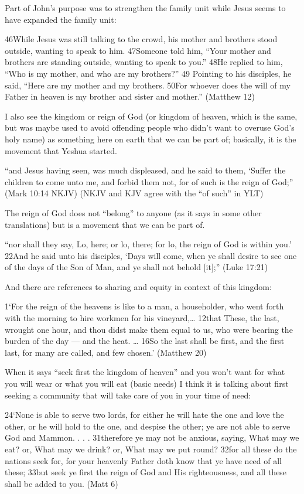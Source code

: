 \documentclass[11pt]{article}
\begin{document}
Part of John’s purpose was to strengthen the family unit while Jesus seems to have expanded the family unit:


46While Jesus was still talking to the crowd, his mother and brothers stood outside, wanting to speak to him. 47Someone told him, “Your mother and brothers are standing outside, wanting to speak to you.” 48He replied to him, “Who is my mother, and who are my brothers?” 49 Pointing to his disciples, he said, “Here are my mother and my brothers. 50For whoever does the will of my Father in heaven is my brother and sister and mother.” (Matthew 12)

I also see the kingdom or reign of God (or kingdom of heaven, which is the
same, but was maybe used to avoid offending people who didn’t want to overuse God’s holy name) as something here on earth that we can be part of; basically, it is the movement that Yeshua started.

“and Jesus having seen, was much displeased, and he said to them, ‘Suffer the children to come unto me, and forbid them not, for of such is the reign of God;” (Mark 10:14 NKJV) (NKJV and KJV agree
with the “of such” in YLT)

The reign of God does not “belong” to anyone (as it says in some other translations) but is a movement that we can be part of.


“nor shall they say, Lo, here; or lo, there; for lo, the reign of God is within you.’ 22And he said unto his disciples, ‘Days will come, when ye shall desire to see one of the days of the Son of Man, and ye shall not behold [it];” (Luke 17:21)

And there are references to sharing and equity in context of this kingdom:

1‘For the reign of the heavens is like to a man, a householder, who went forth with the morning to hire workmen for his vineyard,… 12that These, the last, wrought one hour, and thou didst make them equal to us, who were bearing the burden of the day — and the heat. … 16So the last shall be first, and the first last, for many are called, and few chosen.’ (Matthew 20)

When it says “seek first the kingdom of heaven” and you won’t want for what you will wear or what you will eat (basic needs) I think it is talking about first seeking a community that will take care of you in your time of need:

24‘None is able to serve two lords, for either he will hate the one and love the other, or he will hold to the one, and despise the other; ye are not able to serve God and Mammon. . . . 31therefore ye may not be anxious, saying, What may we eat? or, What may we drink? or, What may we put round? 32for all these do the nations seek for, for your heavenly Father doth know that ye have need of all these; 33but seek ye first the reign of God and His righteousness, and all these shall be added to you. (Matt 6)
\end{document}
